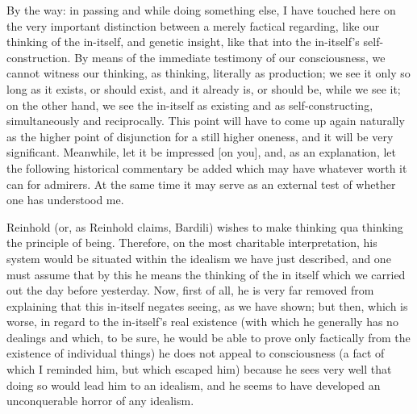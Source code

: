 By the way: in passing and while doing something else,
I have touched here on the very important distinction
between a merely factical regarding,
like our thinking of the in-itself,
and genetic insight,
like that into the in-itself’s self-construction.
By means of the immediate testimony of our consciousness,
we cannot witness our thinking, as thinking,
literally as production;
we see it only so long as it exists,
or should exist, and it already is, or should be, while we see it;
on the other hand, we see the in-itself as
existing and as self-constructing,
simultaneously and reciprocally.
This point will have to come up again naturally
as the higher point of disjunction
for a still higher oneness,
and it will be very significant.
Meanwhile, let it be impressed [on you],
and, as an explanation,
let the following historical commentary be added
which may have whatever worth it can for admirers.
At the same time it may serve as an external test
of whether one has understood me.

Reinhold (or, as Reinhold claims, Bardili) wishes
to make thinking qua thinking the principle of being.
Therefore, on the most charitable interpretation,
his system would be situated within
the idealism we have just described,
and one must assume that by this he means
the thinking of the in itself
which we carried out the day before yesterday.
Now, first of all, he is very far removed from
explaining that this in-itself negates seeing,
as we have shown;
but then, which is worse,
in regard to the in-itself’s real existence
(with which he generally has no dealings
and which, to be sure, he would be able to prove
only factically from the existence of individual things)
he does not appeal to consciousness
(a fact of which I reminded him, but which escaped him)
because he sees very well that doing so
would lead him to an idealism,
and he seems to have developed
an unconquerable horror of any idealism.

